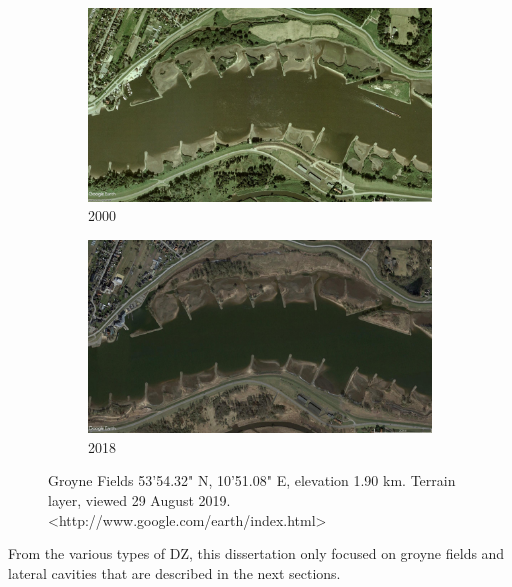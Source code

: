 \begin{figure}[!ht]
\centering
\begin{subfigure}{0.49\textwidth}
  \centering
  \includegraphics[width=0.9\linewidth]{../images/introduction/sat2000.jpg}
  \caption{2000}
  \label{fig:sat2000}
\end{subfigure}%
\begin{subfigure}{.49\textwidth}
  \centering
  \includegraphics[width=0.9\linewidth]{../images/introduction/sat2018.jpg}
  \caption{2018}
  \label{fig:sat2018}
\end{subfigure}
\caption{Groyne Fields 53'54.32" N,  10'51.08" E, elevation 1.90 km. Terrain layer, viewed 29 August 2019. <http://www.google.com/earth/index.html>}
\label{fig:satelliteImage}
\end{figure}

From the various types of DZ, this dissertation only focused on groyne fields and lateral cavities that are described in the next sections.

